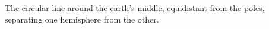 The circular line around the earth's middle, equidistant from the poles, 
separating one hemisphere from the other.